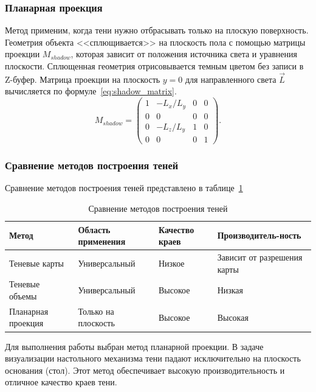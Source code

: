 \subsubsection{Планарная проекция}
Метод применим, когда тени нужно отбрасывать только на плоскую поверхность. Геометрия объекта <<сплющивается>> на плоскость пола с помощью матрицы проекции $M_{shadow}$, которая зависит от положения источника света и уравнения плоскости. Сплющенная геометрия отрисовывается темным цветом без записи в Z-буфер.
Матрица проекции на плоскость $y=0$ для направленного света $\vec{L}$ вычисляется по формуле~\eqref{eq:shadow_matrix}.
\begin{equation}
	M_{shadow} = \begin{pmatrix}
		1 & -L_x/L_y & 0 & 0 \\
		0 & 0        & 0 & 0 \\
		0 & -L_z/L_y & 1 & 0 \\
		0 & 0        & 0 & 1
	\end{pmatrix}.
	\label{eq:shadow_matrix}
\end{equation}

\subsubsection{Сравнение методов построения теней}

Сравнение методов построения теней представлено в таблице~\ref{table:shadows}

\begin{table}[h!]
	\centering
	\caption{Сравнение методов построения теней}
	\label{table:shadows}
	\begin{tabular}{|p{3.4cm}|p{4cm}|p{2.5cm}|p{3.5cm}|}
		\hline
		Метод              & Область применения  & Качество краев & Производитель-ность         \\ \hline
		Теневые карты      & Универсальный       & Низкое         & Зависит от разрешения карты \\ \hline
		Теневые объемы     & Универсальный       & Высокое        & Низкая                      \\ \hline
		Планарная проекция & Только на плоскость & Высокое        & Высокая                     \\ \hline
	\end{tabular}
\end{table}

Для выполнения работы выбран метод планарной проекции. В задаче визуализации настольного механизма тени падают исключительно на плоскость основания (стол). Этот метод обеспечивает высокую производительность и отличное качество краев тени.

